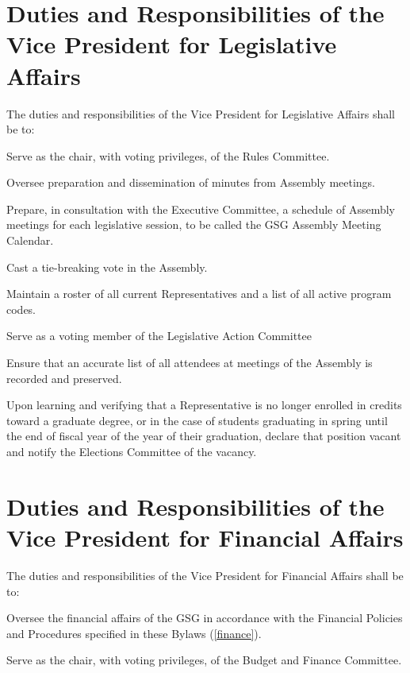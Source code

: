 \section{Duties and Responsibilities of the Vice President for Legislative Affairs}
The duties and responsibilities of the Vice President for Legislative Affairs shall be to:
\begin{bylaws-number}
  \item Serve as the chair, with voting privileges, of the Rules Committee.
  \item Oversee preparation and dissemination of minutes from Assembly meetings.
  \item Prepare, in consultation with the Executive Committee, a schedule of Assembly meetings for each legislative session, to be called the GSG Assembly Meeting Calendar.
  \item Cast a tie-breaking vote in the Assembly.
  \item Maintain a roster of all current Representatives and a list of all active program codes.
  \item Serve as a voting member of the Legislative Action Committee
  \item Ensure that an accurate list of all attendees at meetings of the Assembly is recorded and preserved.
  \item Upon learning and verifying that a Representative is no longer enrolled in credits toward a graduate degree, or in the case of students graduating in spring until the end of fiscal year of the year of their graduation, declare that position vacant and notify the Elections Committee of the vacancy.
\end{bylaws-number}

\section{Duties and Responsibilities of the Vice President for Financial Affairs}
The duties and responsibilities of the Vice President for Financial Affairs shall be to:
\begin{bylaws-number}
  \item Oversee the financial affairs of the GSG in accordance with the Financial Policies and Procedures specified in these Bylaws (\chaptername \ref{finance}).
  \item Serve as the chair, with voting privileges, of the Budget and Finance Committee.
\end{bylaws-number}

